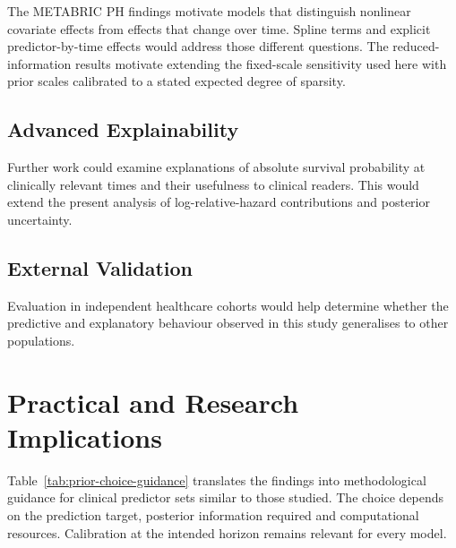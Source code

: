 The METABRIC PH findings motivate models that distinguish nonlinear covariate effects from effects that change over time. Spline terms and explicit predictor-by-time effects would address those different questions. The reduced-information results motivate extending the fixed-scale sensitivity used here with prior scales calibrated to a stated expected degree of sparsity.

\subsection{Advanced Explainability}\label{advanced-explainability}

Further work could examine explanations of absolute survival probability at clinically relevant times and their usefulness to clinical readers. This would extend the present analysis of log-relative-hazard contributions and posterior uncertainty.

\subsection{External Validation}\label{external-validation}

Evaluation in independent healthcare cohorts would help determine whether the predictive and explanatory behaviour observed in this study generalises to other populations.

\section{Practical and Research Implications}\label{practical-and-research-implications}

Table~\ref{tab:prior-choice-guidance} translates the findings into methodological guidance for clinical predictor sets similar to those studied. The choice depends on the prediction target, posterior information required and computational resources. Calibration at the intended horizon remains relevant for every model.

